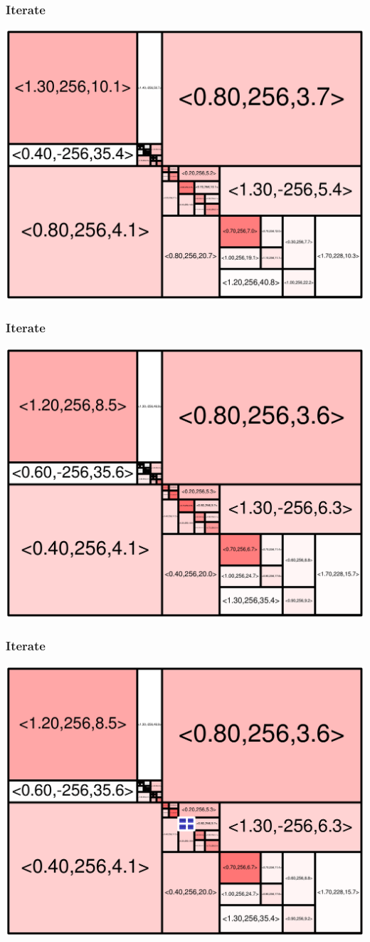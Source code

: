 \begin{frame}
\frametitle{Iterate}\begin{centering}\includegraphics[width=8.5 cm]{remy-graph/graph/test54.pdf}

\end{centering}\end{frame}


\begin{frame}
\frametitle{Iterate}\begin{centering}\includegraphics[width=8.5 cm]{remy-graph/graph/test55.pdf}

\end{centering}\end{frame}


\begin{frame}
\frametitle{Iterate}\begin{centering}\includegraphics[width=8.5 cm]{remy-graph/graph/test56.pdf}

\end{centering}\end{frame}


